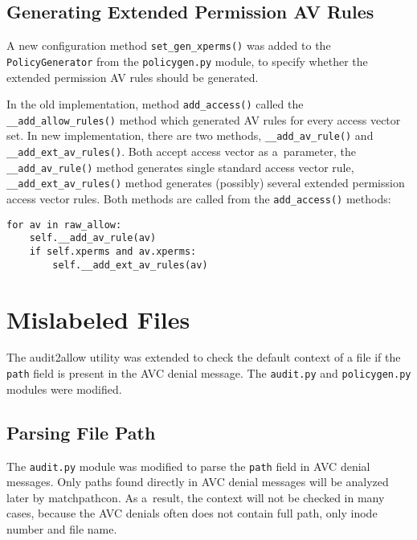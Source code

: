 \subsection{Generating Extended Permission AV Rules}
A new configuration method \texttt{set\_gen\_xperms()} was added to the
\texttt{PolicyGenerator} from the \texttt{policygen.py} module, to specify
whether the extended permission AV rules should be generated.

In the old implementation, method \texttt{add\_access()} called the
\texttt{\_\_add\_allow\_rules()} method which generated AV rules for every
access vector set. In new implementation, there are two methods,
\texttt{\_\_add\_av\_rule()} and \texttt{\_\_add\_ext\_av\_rules()}. Both accept
access vector as a~parameter, the \texttt{\_\_add\_av\_rule()} method generates
single standard access vector rule, \texttt{\_\_add\_ext\_av\_rules()} method
generates (possibly) several extended permission access vector rules. Both
methods are called from the \texttt{add\_access()} methods:
\begin{lstlisting}
for av in raw_allow:
    self.__add_av_rule(av)
    if self.xperms and av.xperms:
        self.__add_ext_av_rules(av)
\end{lstlisting}


\section{Mislabeled Files}
The audit2allow utility was extended to check the default context of a file if
the \texttt{path} field is present in the AVC denial message. The
\texttt{audit.py} and \texttt{policygen.py} modules were modified.

\subsection{Parsing File Path}
The \texttt{audit.py} module was modified to parse the \texttt{path} field in
AVC denial messages. Only paths found directly in AVC denial messages will be
analyzed later by matchpathcon. As a~result, the context will not be checked in
many cases, because the AVC denials often does not contain full path, only inode
number and file name.


